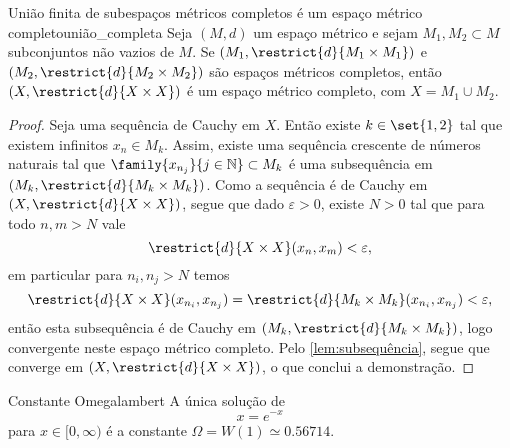 \begin{lemma}{União finita de subespaços métricos completos é um espaço métrico completo}{união_completa}
    Seja \((M,d)\) um espaço métrico e sejam \(M_1, M_2 \subset M\) subconjuntos não vazios de \(M\). Se \((M_1, \restrict{d}{M_1\times M_1})\) e \((M_2, \restrict{d}{M_2\times M_2})\) são espaços métricos completos, então \((X, \restrict{d}{X\times X})\) é um espaço métrico completo, com \(X = M_1 \cup M_2\).
\end{lemma}
\begin{proof}
    Seja  uma sequência de Cauchy em \(X\). Então existe \(k \in \set{1,2}\) tal que existem infinitos \(x_n \in M_k\). Assim, existe uma sequência crescente  de números naturais tal que \(\family{x_{n_j}}{j\in \mathbb{N}} \subset M_k\) é uma subsequência em \((M_k,\restrict{d}{M_k \times M_k})\). Como a sequência é de Cauchy em \((X, \restrict{d}{X\times X})\), segue que dado \(\varepsilon > 0\), existe \(N > 0\) tal que para todo \(n,m > N\) vale
    \begin{equation*}
        \restrict{d}{X\times X}(x_n, x_m) < \varepsilon,
    \end{equation*}
    em particular para \(n_i, n_j > N\) temos
    \begin{equation*}
        \restrict{d}{X\times X}(x_{n_i}, x_{n_j}) = \restrict{d}{M_k \times M_k}(x_{n_i}, x_{n_j}) < \varepsilon,
    \end{equation*}
    então esta subsequência é de Cauchy em \((M_k, \restrict{d}{M_k\times M_k})\), logo convergente neste espaço métrico completo. Pelo \cref{lem:subsequência}, segue que  converge em \((X, \restrict{d}{X\times X})\), o que conclui a demonstração.
\end{proof}
\begin{proposition}{Constante Omega}{lambert}
    A única solução de
    \begin{equation*}
        x = e^{-x}
    \end{equation*}
    para \(x \in [0,\infty)\) é a constante \(\Omega = W(1) \simeq 0.56714.\)
\end{proposition}
